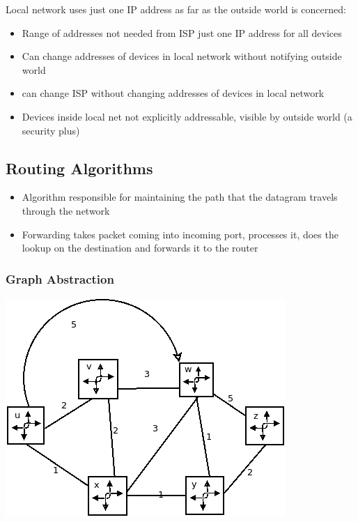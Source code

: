 \documentclass[11pt]{article}
\begin{document}
Local network uses just one IP address as far as the outside world is
concerned:
\begin{itemize}
\item Range of addresses not needed from ISP just one IP address for all devices
\item Can change addresses of devices in local network without notifying
outside world
\item can change ISP without changing addresses of devices in local network
\item Devices inside local net not explicitly addressable, visible by
outside world (a security plus)
\end{itemize}

\subsection{Routing Algorithms}
\label{sec:org4b6ee0c}
\begin{itemize}
\item Algorithm responsible for maintaining the path that the datagram
travels through the network
\item Forwarding takes packet coming into incoming port, processes it,
does the lookup on the destination and forwards it to the router
\end{itemize}

\subsubsection{Graph Abstraction}
\label{sec:org68f8922}

\begin{center}
\includegraphics[width=.9\linewidth]{../img/graphAbstraction.png}
\end{center}
\end{document}
